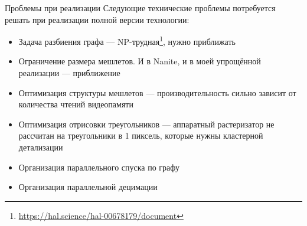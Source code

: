 \begin{frame}{Проблемы при реализации}
    Следующие технические проблемы потребуется решать при реализации полной версии технологии:
    \begin{itemize}
        \item Задача разбиения графа --- NP-трудная\footnote{\url{https://hal.science/hal-00678179/document}}, нужно приближать
        \item Ограничение размера мешлетов. И в Nanite, и в моей упрощённой реализации --- приближение
        \item Оптимизация структуры мешлетов --- производительность сильно зависит от количества чтений видеопамяти
        \item Оптимизация отрисовки треугольников --- аппаратный растеризатор не рассчитан на треугольники в 1 пиксель, которые нужны кластерной детализации
        \item Организация параллельного спуска по графу
        \item Организация параллельной децимации
    \end{itemize}
\end{frame}
